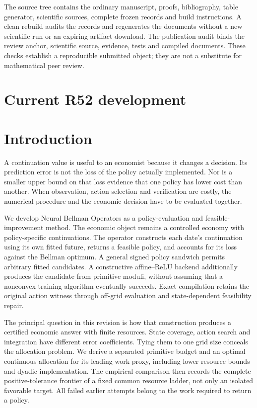 \documentclass[ecta,nameyear,draft]{econsocart}
\begin{document}
The source tree contains the ordinary manuscript, proofs, bibliography, table generator, scientific sources, complete frozen records and build instructions. A clean rebuild audits the records and regenerates the documents without a new scientific run or an expiring artifact download. The publication audit binds the review anchor, scientific source, evidence, tests and compiled documents. These checks establish a reproducible submitted object; they are not a substitute for mathematical peer review.

\clearpage
\section*{Current R52 development}
\section{Introduction}\label{sec:introduction49}
A continuation value is useful to an economist because it changes a decision. Its prediction error is not the loss of the policy actually implemented. Nor is a smaller upper bound on that loss evidence that one policy has lower cost than another. When observation, action selection and verification are costly, the numerical procedure and the economic decision have to be evaluated together.

We develop Neural Bellman Operators as a policy-evaluation and feasible-improvement method. The economic object remains a controlled economy with policy-specific continuations. The operator constructs each date's continuation using its own fitted future, returns a feasible policy, and accounts for its loss against the Bellman optimum. A general signed policy sandwich permits arbitrary fitted candidates. A constructive affine--ReLU backend additionally produces the candidate from primitive moduli, without assuming that a nonconvex training algorithm eventually succeeds. Exact compilation retains the original action witness through off-grid evaluation and state-dependent feasibility repair.

The principal question in this revision is how that construction produces a certified economic answer with finite resources. State coverage, action search and integration have different error coefficients. Tying them to one grid size conceals the allocation problem. We derive a separated primitive budget and an optimal continuous allocation for its leading work proxy, including lower resource bounds and dyadic implementation. The empirical comparison then records the complete positive-tolerance frontier of a fixed common resource ladder, not only an isolated favorable target. All failed earlier attempts belong to the work required to return a policy.
\end{document}
